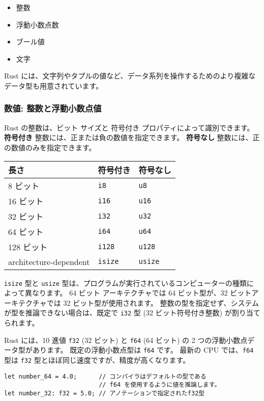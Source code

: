 \begin{itemize}
\item 整数
\item 浮動小数点数
\item ブール値
\item 文字
\end{itemize}

Rust には、文字列やタプルの値など、データ系列を操作するためのより複雑なデータ型も用意されています。

\subsubsection{数値: 整数と浮動小数点値}

Rust の整数は、ビット サイズと 符号付き プロパティによって識別できます。 \textbf{符号付き} 整数には、正または負の数値を指定できます。 \textbf{符号なし} 整数には、正の数値のみを指定できます。

\begin{tabular}{lll}
長さ & 符号付き & 符号なし\\ \hline
8 ビット & \texttt{i8} & \texttt{u8}\\ \hline
16 ビット & \texttt{i16} & \texttt{u16}\\ \hline
32 ビット & \texttt{i32} & \texttt{u32}\\ \hline
64 ビット & \texttt{i64} & \texttt{u64}\\ \hline
128 ビット & \texttt{i128} & \texttt{u128}\\ \hline
architecture-dependent & \texttt{isize} & \texttt{usize}\\
\end{tabular}

\texttt{isize} 型と \texttt{usize} 型は、プログラムが実行されているコンピューターの種類によって異なります。 64 ビット アーキテクチャでは 64 ビット型が、32 ビットアーキテクチャでは 32 ビット型が使用されます。 整数の型を指定せず、システムが型を推論できない場合は、既定で \texttt{i32} 型 (32 ビット符号付き整数) が割り当てられます。

Rust には、10 進値 \texttt{f32} (32 ビット) と \texttt{f64} (64 ビット) の 2 つの浮動小数点データ型があります。 既定の浮動小数点型は \texttt{f64} です。 最新の CPU では、\texttt{f64} 型は \texttt{f32} 型とほぼ同じ速度ですが、精度が高くなります。



\begin{lstlisting}[numbers=none]
let number_64 = 4.0;      // コンパイラはデフォルトの型である
                          // f64 を使用するように値を推論します。
let number_32: f32 = 5.0; // アノテーションで指定されたf32型
\end{lstlisting}

